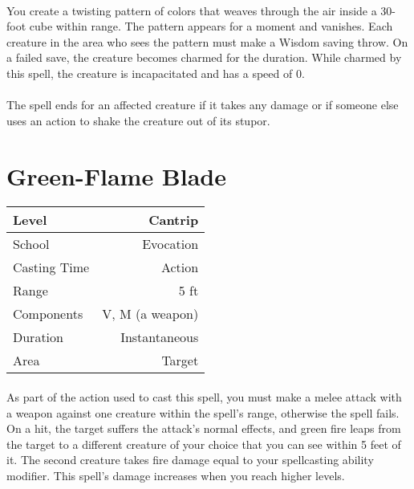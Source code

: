 \documentclass[a5paper,12pt]{article}
\begin{document}
\paragraph{}
You create a twisting pattern of colors that weaves through the air inside a 30-foot cube within range. The pattern appears for a moment and vanishes. Each creature in the area who sees the pattern must make a Wisdom saving throw. On a failed save, the creature becomes charmed for the duration. While charmed by this spell, the creature is incapacitated and has a speed of 0.

\paragraph{}
The spell ends for an affected creature if it takes any damage or if someone else uses an action to shake the creature out of its stupor.

\newpage

\section*{Green-Flame Blade}
\begin{table}[h]
   \centering
   \begin{tabular}{|l|r|}
      \hline
      Level        & Cantrip \\
      \hline
      School       & Evocation \\
      \hline
      Casting Time & Action \\
      \hline
      Range        & 5 ft \\
      \hline
      Components   & V, M (a weapon) \\
      \hline
      Duration     & Instantaneous \\
      \hline
      Area         & Target \\
      \hline
   \end{tabular}
\end{table}

\paragraph{}
As part of the action used to cast this spell, you must make a melee attack with a weapon against one creature within the spell's range, otherwise the spell fails. On a hit, the target suffers the attack's normal effects, and green fire leaps from the target to a different creature of your choice that you can see within 5 feet of it. The second creature takes fire damage equal to your spellcasting ability modifier. This spell's damage increases when you reach higher levels.
\end{document}
